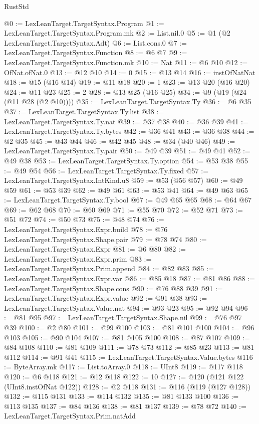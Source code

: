 \begin{lexlean}{RustStd}
\begin{coremodule}
{\begin{coremodule}
{{{{{@0 := LexLeanTarget.TargetSyntax.Program
@1 := LexLeanTarget.TargetSyntax.Program.mk
@2 := List.nil.{0}
@5 := @1 (@2 LexLeanTarget.TargetSyntax.Adt)
@6 := List.cons.{0}
@7 := LexLeanTarget.TargetSyntax.Function
@8 := @6 @7
@9 := LexLeanTarget.TargetSyntax.Function.mk
@10 := Nat
@11 := @6 @10
@12 := OfNat.ofNat.{0}
@13 := @12 @10
@14 := 0
@15 := @13 @14
@16 := instOfNatNat
@18 := @15 (@16 @14)
@19 := @11 @18
@20 := 1
@23 := @13 @20 (@16 @20)
@24 := @11 @23
@25 := 2
@28 := @13 @25 (@16 @25)
@34 := @9 (@19 (@24 (@11 @28 (@2 @10))))
@35 := LexLeanTarget.TargetSyntax.Ty
@36 := @6 @35
@37 := LexLeanTarget.TargetSyntax.Ty.list
@38 := LexLeanTarget.TargetSyntax.Ty.nat
@39 := @37 @38
@40 := @36 @39
@41 := LexLeanTarget.TargetSyntax.Ty.bytes
@42 := @36 @41
@43 := @36 @38
@44 := @2 @35
@45 := @43 @44
@46 := @42 @45
@48 := @34 (@40 @46)
@49 := LexLeanTarget.TargetSyntax.Ty.pair
@50 := @49 @39
@51 := @49 @41
@52 := @49 @38
@53 := LexLeanTarget.TargetSyntax.Ty.option
@54 := @53 @38
@55 := @49 @54
@56 := LexLeanTarget.TargetSyntax.Ty.fixed
@57 := LexLeanTarget.TargetSyntax.IntKind.u8
@59 := @53 (@56 @57)
@60 := @49 @59
@61 := @53 @39
@62 := @49 @61
@63 := @53 @41
@64 := @49 @63
@65 := LexLeanTarget.TargetSyntax.Ty.bool
@67 := @49 @65 @65
@68 := @64 @67
@69 := @62 @68
@70 := @60 @69
@71 := @55 @70
@72 := @52 @71
@73 := @51 @72
@74 := @50 @73
@75 := @48 @74
@76 := LexLeanTarget.TargetSyntax.Expr.build
@78 := @76 LexLeanTarget.TargetSyntax.Shape.pair
@79 := @78 @74
@80 := LexLeanTarget.TargetSyntax.Expr
@81 := @6 @80
@82 := LexLeanTarget.TargetSyntax.Expr.prim
@83 := LexLeanTarget.TargetSyntax.Prim.append
@84 := @82 @83
@85 := LexLeanTarget.TargetSyntax.Expr.var
@86 := @85 @18
@87 := @81 @86
@88 := LexLeanTarget.TargetSyntax.Shape.cons
@90 := @76 @88 @39
@91 := LexLeanTarget.TargetSyntax.Expr.value
@92 := @91 @38
@93 := LexLeanTarget.TargetSyntax.Value.nat
@94 := @93 @23
@95 := @92 @94
@96 := @81 @95
@97 := LexLeanTarget.TargetSyntax.Shape.nil
@99 := @76 @97 @39
@100 := @2 @80
@101 := @99 @100
@103 := @81 @101 @100
@104 := @96 @103
@105 := @90 @104
@107 := @81 @105 @100
@108 := @87 @107
@109 := @84 @108
@110 := @81 @109
@111 := @78 @73
@112 := @85 @23
@113 := @81 @112
@114 := @91 @41
@115 := LexLeanTarget.TargetSyntax.Value.bytes
@116 := ByteArray.mk
@117 := List.toArray.{0}
@118 := UInt8
@119 := @117 @118
@120 := @6 @118
@121 := @12 @118
@122 := 10
@127 := @120 (@121 @122 (UInt8.instOfNat @122))
@128 := @2 @118
@131 := @116 (@119 (@127 @128))
@132 := @115 @131
@133 := @114 @132
@135 := @81 @133 @100
@136 := @113 @135
@137 := @84 @136
@138 := @81 @137
@139 := @78 @72
@140 := LexLeanTarget.TargetSyntax.Prim.natAdd
}}}}}
\end{coremodule}}
\end{coremodule}
\end{lexlean}
